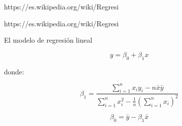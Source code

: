 https://es.wikipedia.org/wiki/Regresi%

https://es.wikipedia.org/wiki/Regresi%

El modelo de regresión lineal

\[
y = \beta_0 + \beta_1 x
\]

donde:

\[
\beta_1 = \frac{\sum_{i=1}^n x_iy_i - n \bar{x}\bar{y}}{\sum_{i=1}^n x_i^2 - \frac{1}{n}(\sum_{i=1}^n x_i)^2}
\]

\[
\beta_0= \bar{y} - \beta_1 \bar{x}
\]






